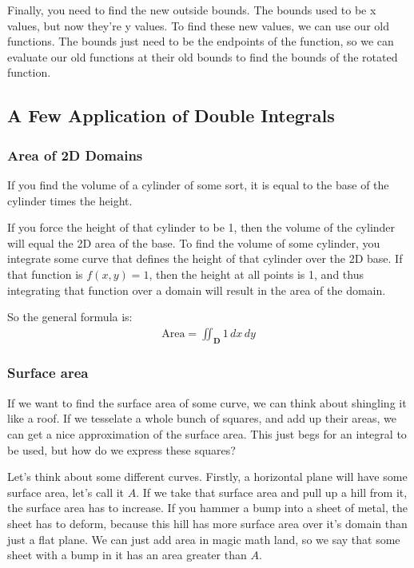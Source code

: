 \documentclass[12pt, letterpaper]{article}
\begin{document}
Finally, you need to find the new outside bounds. 
The bounds used to be x values, but now they're y values.
To find these new values, we can use our old functions.
The bounds just need to be the endpoints of the function, so we can evaluate our old functions at their old bounds to find the bounds of the rotated function.

\subsection{A Few Application of Double Integrals}
\subsubsection{Area of 2D Domains}
If you find the volume of a cylinder of some sort, it is equal to the base of the cylinder times the height.

If you force the height of that cylinder to be 1, then the volume of the cylinder will equal the 2D area of the base.
To find the volume of some cylinder, you integrate some curve that defines the height of that cylinder over the 2D base.
If that function is $f(x, y) = 1$, then the height at all points is 1, and thus integrating that function over a domain will result in the area of the domain.

So the general formula is:
\begin{gather*}
    \text{Area} = \iint_{\mathbf{D}} 1\,dx\,dy
\end{gather*}

\subsubsection{Surface area}
If we want to find the surface area of some curve, we can think about shingling it like a roof.
If we tesselate a whole bunch of squares, and add up their areas, we can get a nice approximation of the surface area.
This just begs for an integral to be used, but how do we express these squares?

Let's think about some different curves. Firstly, a horizontal plane will have some surface area, let's call it $A$.
If we take that surface area and pull up a hill from it, the surface area has to increase.
If you hammer a bump into a sheet of metal, the sheet has to deform, because this hill has more surface area over it's domain than just a flat plane.
We can just add area in magic math land, so we say that some sheet with a bump in it has an area greater than $A$.
\end{document}
